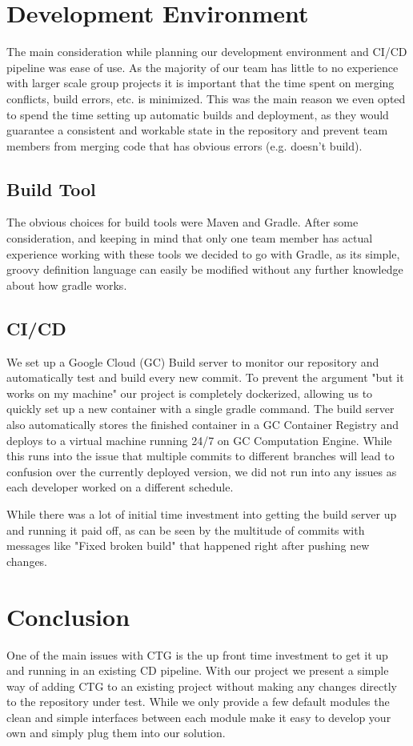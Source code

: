 \documentclass[12pt, a4paper]{article}
\begin{document}
\section{Development Environment}
The main consideration while planning our development environment and CI/CD pipeline was ease of use. As the majority of our team has little to no experience with larger scale group projects it is important that the time spent on merging conflicts, build errors, etc. is minimized. This was the main reason we even opted to spend the time setting up automatic builds and deployment, as they would guarantee a consistent and workable state in the repository and prevent team members from merging code that has obvious errors (e.g. doesn't build).

\subsection{Build Tool} 
The obvious choices for build tools were Maven and Gradle. After some consideration, and keeping in mind that only one team member has actual experience working with these tools we decided to go with Gradle, as its simple, groovy definition language can easily be modified without any further knowledge about how gradle works.
\subsection{CI/CD}
We set up a Google Cloud (GC) Build server to monitor our repository and automatically test and build every new commit. To prevent the argument "but it works on my machine" our project is completely dockerized, allowing us to quickly set up a new container with a single gradle command. The build server also automatically stores the finished container in a GC Container Registry and deploys to a virtual machine running 24/7 on GC Computation Engine. While this runs into the issue that multiple commits to different branches will lead to confusion over the currently deployed version, we did not run into any issues as each developer worked on a different schedule.

While there was a lot of initial time investment into getting the build server up and running it paid off, as can be seen by the multitude of commits with messages like "Fixed broken build" that happened right after pushing new changes.

\section{Conclusion}
One of the main issues with CTG is the up front time investment to get it up and running in an existing CD pipeline. With our project we present a simple way of adding CTG to an existing project without making any changes directly to the repository under test. While we only provide a few default modules the clean and simple interfaces between each module make it easy to develop your own and simply plug them into our solution.
\end{document}
